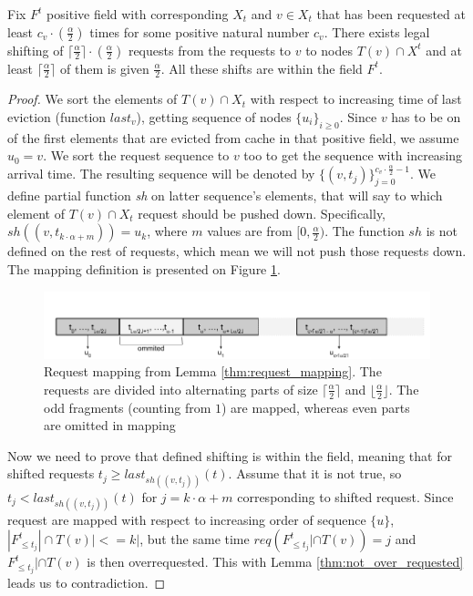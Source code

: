 \begin{lemma}
Fix $F^t$ positive field with corresponding $X_t$ and $v \in X_t$ that has 
been requested at least $c_v \cdot (\frac{\alpha}{2})$ times for some positive 
natural number $c_v$. There exists legal shifting of $\lceil \frac{\alpha}{2} 
\rceil \cdot (\frac{\alpha}{2})$ requests from the requests to $v$ to nodes 
$T(v) \cap X^t$ and at least $\lceil \frac{\alpha}{2} \rceil$ of them is given 
$\frac{\alpha}{2}$. All these shifts are within the field $F^t$.
\label{thm:request_mapping}
\end{lemma}
\begin{proof}
We sort the elements of $T(v) \cap X_t$ with respect to increasing time of last 
eviction (function $last_v$), getting sequence of nodes $\{u_i\}_{i \geq 
0}$. Since $v$ has to be on of the first elements that are evicted from cache 
in that positive field, we assume $u_0 = v$. We sort the request sequence to 
$v$ too to get the sequence with increasing arrival time. The resulting 
sequence will be denoted by $\{(v, t_j)\}_{j=0}^{c_v \cdot \frac{\alpha}{2} - 
1}$. We define partial function \textit{sh} on latter sequence's 
elements, that will say to which element of $T(v) \cap X_t$ request should be 
pushed down. Specifically, $sh((v, t_{k \cdot \alpha + m})) = u_k$, where $m$ 
values are from $[0, \frac{\alpha}{2})$. The function $sh$ is not defined on 
the rest of requests, which mean we will not push those requests down. The 
mapping definition is presented on Figure \ref{fig:req_map}.
\begin{figure}
 \begin{center}
  \includegraphics[width=1.1\textwidth]{request_mapping.png}
 \end{center}
 \caption{Request mapping from Lemma \ref{thm:request_mapping}. The requests 
are divided into alternating parts of size $\lceil \frac{\alpha}{2} \rceil$ 
and $\lfloor \frac{\alpha}{2} \rfloor$. The odd fragments (counting from $1$) 
are mapped, whereas even parts are omitted in mapping}
 \label{fig:req_map}
\end{figure}

Now we need to prove that defined shifting is within the field, meaning that 
for shifted requests $t_j \geq last_{sh((v, t_j))}(t)$. Assume that it is not 
true, so $t_j < last_{sh((v, t_j))}(t)$ for $j = k \cdot \alpha + m$ 
corresponding to shifted request. Since request are mapped with respect to 
increasing order of sequence $\{u\}$, $|F^t_{\leq t_j}| \cap T(v)| <= k|$, but 
the same time $req(F^t_{\leq t_j}| \cap T(v)) = j$ and $F^t_{\leq t_j}| \cap 
T(v)$ is then overrequested. This with Lemma \ref{thm:not_over_requested} leads 
us to contradiction.
\end{proof}
